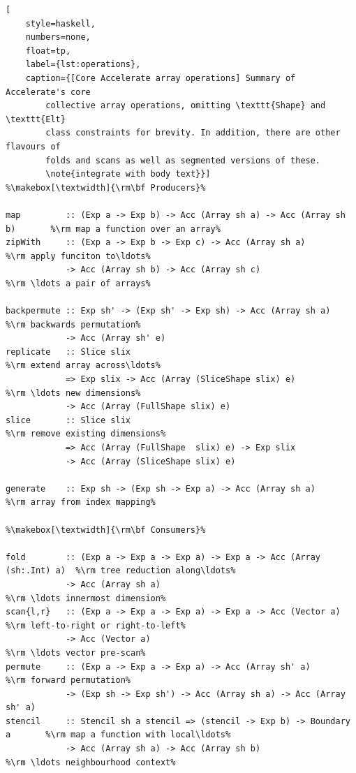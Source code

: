 \begin{lstlisting}[
    style=haskell,
    numbers=none,
    float=tp,
    label={lst:operations},
    caption={[Core Accelerate array operations] Summary of Accelerate's core
        collective array operations, omitting \texttt{Shape} and \texttt{Elt}
        class constraints for brevity. In addition, there are other flavours of
        folds and scans as well as segmented versions of these.
        \note{integrate with body text}}]
%\makebox[\textwidth]{\rm\bf Producers}%

map         :: (Exp a -> Exp b) -> Acc (Array sh a) -> Acc (Array sh b)       %\rm map a function over an array%
zipWith     :: (Exp a -> Exp b -> Exp c) -> Acc (Array sh a)                  %\rm apply funciton to\ldots%
            -> Acc (Array sh b) -> Acc (Array sh c)                           %\rm \ldots a pair of arrays%

backpermute :: Exp sh' -> (Exp sh' -> Exp sh) -> Acc (Array sh a)             %\rm backwards permutation%
            -> Acc (Array sh' e)
replicate   :: Slice slix                                                     %\rm extend array across\ldots%
            => Exp slix -> Acc (Array (SliceShape slix) e)                    %\rm \ldots new dimensions%
            -> Acc (Array (FullShape slix) e)
slice       :: Slice slix                                                     %\rm remove existing dimensions%
            => Acc (Array (FullShape  slix) e) -> Exp slix
            -> Acc (Array (SliceShape slix) e)

generate    :: Exp sh -> (Exp sh -> Exp a) -> Acc (Array sh a)                %\rm array from index mapping%

%\makebox[\textwidth]{\rm\bf Consumers}%

fold        :: (Exp a -> Exp a -> Exp a) -> Exp a -> Acc (Array (sh:.Int) a)  %\rm tree reduction along\ldots%
            -> Acc (Array sh a)                                               %\rm \ldots innermost dimension%
scan{l,r}   :: (Exp a -> Exp a -> Exp a) -> Exp a -> Acc (Vector a)           %\rm left-to-right or right-to-left%
            -> Acc (Vector a)                                                 %\rm \ldots vector pre-scan%
permute     :: (Exp a -> Exp a -> Exp a) -> Acc (Array sh' a)                 %\rm forward permutation%
            -> (Exp sh -> Exp sh') -> Acc (Array sh a) -> Acc (Array sh' a)
stencil     :: Stencil sh a stencil => (stencil -> Exp b) -> Boundary a       %\rm map a function with local\ldots%
            -> Acc (Array sh a) -> Acc (Array sh b)                           %\rm \ldots neighbourhood context%
\end{lstlisting}

